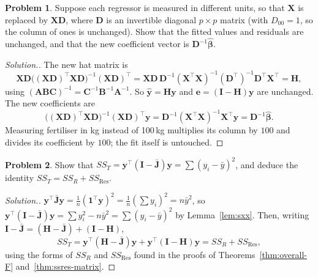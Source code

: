 \documentclass[11pt,a4paper]{article}
\numberwithin{equation}{section}
\theoremstyle{definition}
\newtheorem{problemx}{Problem}[subsection]
\newenvironment{problem}{\begin{problemx}}{\end{problemx}}
\newenvironment{solution}
  {\renewcommand{\qedsymbol}{}\begin{proof}[\textit{Solution}.]}
  {\end{proof}}
\begin{document}
\begin{problem}
Suppose each regressor is measured in different units, so that $\mathbf{X}$ is replaced by
$\mathbf{XD}$, where $\mathbf{D}$ is an invertible diagonal $p \times p$ matrix (with
$D_{00} = 1$, so the column of ones is unchanged). Show that the fitted values and residuals
are unchanged, and that the new coefficient vector is $\mathbf{D}^{-1}\hat{\boldsymbol\beta}$.
\end{problem}

\begin{solution}
The new hat matrix is
\[
\mathbf{XD}\bigl((\mathbf{XD})^\top\mathbf{XD}\bigr)^{-1}(\mathbf{XD})^\top
= \mathbf{XD}\,\mathbf{D}^{-1}(\mathbf{X}^\top\mathbf{X})^{-1}(\mathbf{D}^\top)^{-1}\mathbf{D}^\top\mathbf{X}^\top
= \mathbf{H},
\]
using $(\mathbf{ABC})^{-1} = \mathbf{C}^{-1}\mathbf{B}^{-1}\mathbf{A}^{-1}$. So
$\hat{\mathbf{y}} = \mathbf{Hy}$ and $\mathbf{e} = (\mathbf{I} - \mathbf{H})\mathbf{y}$ are
unchanged. The new coefficients are
\[
\bigl((\mathbf{XD})^\top\mathbf{XD}\bigr)^{-1}(\mathbf{XD})^\top\mathbf{y}
= \mathbf{D}^{-1}(\mathbf{X}^\top\mathbf{X})^{-1}\mathbf{X}^\top\mathbf{y} = \mathbf{D}^{-1}\hat{\boldsymbol\beta} .
\]
Measuring fertiliser in kg instead of 100\,kg multiplies its column by $100$ and divides its
coefficient by $100$; the fit itself is untouched.
\end{solution}

\begin{problem}\label{prob:anova-matrix}
Show that $SS_T = \mathbf{y}^\top(\mathbf{I} - \bar{\mathbf{J}})\mathbf{y} = \sum (y_i - \bar y)^2$,
and deduce the identity $SS_T = SS_R + SS_{\mathrm{Res}}$.
\end{problem}

\begin{solution}
$\mathbf{y}^\top\bar{\mathbf{J}}\mathbf{y} = \frac1n(\mathbf{1}^\top\mathbf{y})^2 = \frac1n\left(\sum y_i\right)^2 = n\bar y^2$,
so $\mathbf{y}^\top(\mathbf{I} - \bar{\mathbf{J}})\mathbf{y} = \sum y_i^2 - n\bar y^2 = \sum (y_i - \bar y)^2$
by Lemma~\ref{lem:sxx}. Then, writing $\mathbf{I} - \bar{\mathbf{J}} = (\mathbf{H} - \bar{\mathbf{J}}) + (\mathbf{I} - \mathbf{H})$,
\[
SS_T = \mathbf{y}^\top(\mathbf{H} - \bar{\mathbf{J}})\mathbf{y} + \mathbf{y}^\top(\mathbf{I} - \mathbf{H})\mathbf{y} = SS_R + SS_{\mathrm{Res}} ,
\]
using the forms of $SS_R$ and $SS_{\mathrm{Res}}$ found in the proofs of
Theorems~\ref{thm:overall-F} and~\ref{thm:ssres-matrix}.
\end{solution}
\end{document}
